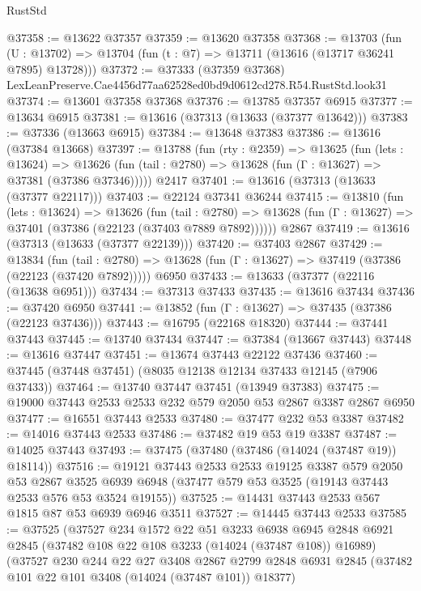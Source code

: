 \begin{lexlean}{RustStd}
\begin{coremodule}
@37358 := @13622 @37357
@37359 := @13620 @37358
@37368 := @13703
    (fun (U : @13702) => @13704 (fun (t : @7) => @13711 (@13616 (@13717 @36241 @7895) @13728)))
@37372 := @37333
    (@37359 @37368)
    LexLeanPreserve.Cae4456d77aa62528ed0bd9d0612cd278.R54.RustStd.look31
@37374 := @13601 @37358 @37368
@37376 := @13785 @37357 @6915
@37377 := @13634 @6915
@37381 := @13616 (@37313 (@13633 (@37377 @13642)))
@37383 := @37336 (@13663 @6915)
@37384 := @13648 @37383
@37386 := @13616 (@37384 @13668)
@37397 := @13788
    (fun (rty : @2359) =>
    @13625
      (fun (lets : @13624) =>
      @13626 (fun (tail : @2780) => @13628 (fun (Γ : @13627) => @37381 (@37386 @37346)))))
    @2417
@37401 := @13616 (@37313 (@13633 (@37377 @22117)))
@37403 := @22124 @37341 @36244
@37415 := @13810
    (fun (lets : @13624) =>
    @13626
      (fun (tail : @2780) =>
      @13628 (fun (Γ : @13627) => @37401 (@37386 (@22123 (@37403 @7889 @7892))))))
    @2867
@37419 := @13616 (@37313 (@13633 (@37377 @22139)))
@37420 := @37403 @2867
@37429 := @13834
    (fun (tail : @2780) => @13628 (fun (Γ : @13627) => @37419 (@37386 (@22123 (@37420 @7892)))))
    @6950
@37433 := @13633 (@37377 (@22116 (@13638 @6951)))
@37434 := @37313 @37433
@37435 := @13616 @37434
@37436 := @37420 @6950
@37441 := @13852 (fun (Γ : @13627) => @37435 (@37386 (@22123 @37436)))
@37443 := @16795 (@22168 @18320)
@37444 := @37441 @37443
@37445 := @13740 @37434
@37447 := @37384 (@13667 @37443)
@37448 := @13616 @37447
@37451 := @13674 @37443 @22122 @37436
@37460 := @37445 (@37448 @37451) (@8035 @12138 @12134 @37433 @12145 (@7906 @37433))
@37464 := @13740 @37447 @37451 (@13949 @37383)
@37475 := @19000 @37443 @2533 @2533 @232 @579 @2050 @53 @2867 @3387 @2867 @6950
@37477 := @16551 @37443 @2533
@37480 := @37477 @232 @53 @3387
@37482 := @14016 @37443 @2533
@37486 := @37482 @19 @53 @19 @3387
@37487 := @14025 @37443
@37493 := @37475 (@37480 (@37486 (@14024 (@37487 @19)) @18114))
@37516 := @19121
    @37443
    @2533
    @2533
    @19125
    @3387
    @579
    @2050
    @53
    @2867
    @3525
    @6939
    @6948
    (@37477 @579 @53 @3525 (@19143 @37443 @2533 @576 @53 @3524 @19155))
@37525 := @14431 @37443 @2533 @567 @1815 @87 @53 @6939 @6946 @3511
@37527 := @14445 @37443 @2533
@37585 := @37525
    (@37527
      @234
      @1572
      @22
      @51
      @3233
      @6938
      @6945
      @2848
      @6921
      @2845
      (@37482 @108 @22 @108 @3233 (@14024 (@37487 @108)) @16989)
      (@37527
        @230
        @244
        @22
        @27
        @3408
        @2867
        @2799
        @2848
        @6931
        @2845
        (@37482 @101 @22 @101 @3408 (@14024 (@37487 @101)) @18377)

\end{coremodule}
\end{lexlean}
